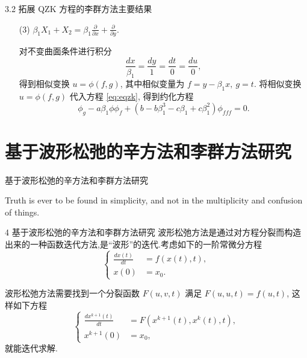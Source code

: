 \documentclass{beamer}
\begin{document}
\begin{frame}{3.2 拓展 QZK 方程的李群方法主要结果}
\begin{itemize}
\item[(3)]$\beta_1X_1+X_2=\beta_1\frac{\partial}{\partial x}+\frac{\partial}{\partial y}.$

对不变曲面条件进行积分
\begin{equation*}
	\frac{dx}{\beta_1}=\frac{dy}{1}=\frac{dt}{0}=\frac{du}{0},
\end{equation*}
得到相似变换 $u=\phi(f,g)$, 其中相似变量为 $f=y-\beta_1x,~g=t$.
将相似变换 $u=\phi(f,g)$ 代入方程 \eqref{eq:eqzk}, 得到约化方程
\begin{equation*}
	\phi_g-a\beta_1\phi \phi_f+(b-b\beta_1^3-c\beta_1+c\beta_1^2)\phi_{fff}=0.
\end{equation*}
\end{itemize}
\end{frame}

\section{基于波形松弛的辛方法和李群方法研究}
\begin{frame}{基于波形松弛的辛方法和李群方法研究}
\begin{exampleblock}{}
\qquad Truth is ever to be found in simplicity, and not in the multiplicity and confusion of things.
\end{exampleblock}
\end{frame}


\begin{frame}{4 基于波形松弛的辛方法和李群方法研究}
\qquad 波形松弛方法是通过对方程分裂而构造出来的一种函数迭代方法,是``波形''的迭代.考虑如下的一阶常微分方程
\begin{equation}\label{eq:03ode}
\left\{
\begin{aligned}
\frac{dx(t)}{dt}&=f(x(t),t),\\
x(0)&=x_{0}.
\end{aligned}
\right.
\end{equation}

波形松弛方法需要找到一个分裂函数 $F(u,v,t)$ 满足 $F(u,u,t)=f(u,t)$, 这样如下方程
\begin{equation*}
\left\{
\begin{aligned}
\frac{dx^{k+1}(t)}{dt}&=F(x^{k+1}(t),x^{k}(t),t),\\
x^{k+1}(0)&=x_{0},
\end{aligned}
\right.
\end{equation*}
就能迭代求解.
\end{frame}
\end{document}
